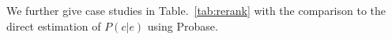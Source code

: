 We further give case studies in Table.~\ref{tab:rerank} with the comparison to the direct estimation of $P(c|e)$ using Probase. 
%
